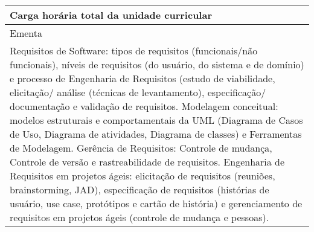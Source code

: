 \begin{quadro}[ht!]
\begin{tabular}{|p{3cm} p{2cm} p{3cm} p{2cm} p{3cm} p{2cm}|}
\multicolumn{5}{|p{13cm}|}{\cellcolor{blue1} Carga horária total da unidade curricular} & \multicolumn{1}{p{1cm}|}{\raggedleft 60	}\\\hline
\multicolumn{6}{|p{15cm}|}{\cellcolor{blue1} Ementa} \\\hline
\hline\multicolumn{6}{|p{15cm}|}{\scriptsize Requisitos de Software: tipos de requisitos (funcionais/não funcionais), níveis de requisitos (do usuário, do sistema e de domínio) e processo de Engenharia de Requisitos (estudo de viabilidade, elicitação/ análise (técnicas de levantamento), especificação/ documentação e validação de requisitos. Modelagem conceitual: modelos estruturais e comportamentais da UML (Diagrama de Casos de Uso, Diagrama de atividades, Diagrama de classes) e Ferramentas de Modelagem. Gerência de Requisitos: Controle de mudança, Controle de versão e rastreabilidade de requisitos. Engenharia de Requisitos em projetos ágeis: elicitação de requisitos (reuniões, brainstorming, JAD), especificação de requisitos (histórias de usuário, use case, protótipos e cartão de história) e gerenciamento de requisitos em projetos ágeis (controle de mudança e pessoas).}\\\hline
\hline
	\end{tabular}
\end{quadro}
